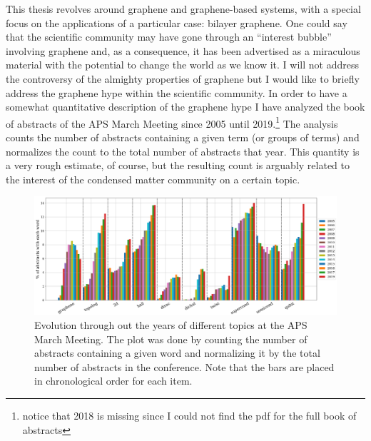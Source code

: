 This thesis revolves around graphene and graphene-based systems, with a special focus on the applications of a particular case: bilayer graphene.
One could say that the scientific community may have gone through an ``interest bubble'' involving graphene and, as a consequence, it has been advertised as a miraculous material with the potential to change the world as we know it. I will not address the controversy of the almighty properties of graphene but I would like to briefly address the graphene hype within the scientific community.
In order to have a somewhat quantitative description of the graphene hype I have analyzed the book of abstracts of the APS March Meeting since 2005 until 2019.\footnote{notice that 2018 is missing since I could not find the pdf for the full book of abstracts}
The analysis counts the number of abstracts containing a given term (or groups of terms) and normalizes the count to the total number of abstracts that year.
This quantity is a very rough estimate, of course, but the resulting count is arguably related to the interest of the condensed matter community on a certain topic.

\begin{figure}[h!]
\centering
\includegraphics{introduction/figures/topics.png}
\vspace{-20pt}
\caption{Evolution through out the years of different topics at the APS March Meeting. The plot was done by counting the number of abstracts containing a given word and normalizing it by the total number of abstracts in the conference. Note that the bars are placed in chronological order for each item.}
\label{topics}
\end{figure}

